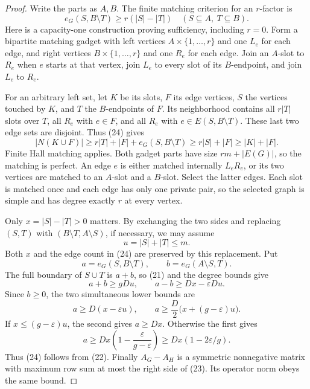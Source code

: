 \begin{proof}
Write the parts as \(A,B\).
The finite matching criterion for an \(r\)-factor is
\[
 e_G(S,B\setminus T)\geq r(|S|-|T|)
 \quad(S\subseteq A,\ T\subseteq B).                         \tag{24}
\]
Here is a capacity-one construction proving sufficiency, including
\(r=0\). Form a bipartite matching gadget with left vertices
\(A\times\{1,\ldots,r\}\) and one \(L_e\) for each edge, and right
vertices \(B\times\{1,\ldots,r\}\) and one \(R_e\) for each edge.
Join an \(A\)-slot to \(R_e\) when \(e\) starts at that vertex,
join \(L_e\) to every slot of its \(B\)-endpoint, and join
\(L_e\) to \(R_e\).

For an arbitrary left set, let \(K\) be its slots, \(F\) its edge
vertices, \(S\) the vertices touched by \(K\), and \(T\) the
\(B\)-endpoints of \(F\). Its neighborhood contains all \(r|T|\)
slots over \(T\), all \(R_e\) with \(e\in F\), and all \(R_e\)
with \(e\in E(S,B\setminus T)\). These last two edge sets are
disjoint. Thus (24) gives
\[
 |N(K\cup F)|\geq r|T|+|F|+e_G(S,B\setminus T)
               \geq r|S|+|F|\geq |K|+|F|.
\]
Finite Hall matching applies. Both gadget parts have size
\(rm+|E(G)|\), so the matching is perfect. An edge \(e\) is
either matched internally \(L_eR_e\), or its two vertices are
matched to an \(A\)-slot and a \(B\)-slot. Select the latter
edges. Each slot is matched once and each edge has only one
private pair, so the selected graph is simple and has degree
exactly \(r\) at every vertex.

Only \(x=|S|-|T|>0\) matters.
By exchanging the two sides and replacing \((S,T)\) with
\((B\setminus T,A\setminus S)\), if necessary, we may assume
\[
 u=|S|+|T|\leq m.
\]
Both \(x\) and the edge count in (24) are preserved by this
replacement. Put
\[
 a=e_G(S,B\setminus T),\qquad b=e_G(A\setminus S,T).
\]
The full boundary of \(S\cup T\) is \(a+b\), so (21) and
the degree bounds give
\[
 a+b\geq gDu,\qquad a-b\geq Dx-\varepsilon Du.
\]
Since \(b\geq0\), the two simultaneous lower bounds are
\[
 a\geq D(x-\varepsilon u),\qquad
 a\geq \frac D2\bigl(x+(g-\varepsilon)u\bigr).                \tag{25}
\]
If \(x\leq(g-\varepsilon)u\), the second gives \(a\geq Dx\).
Otherwise the first gives
\[
 a\geq Dx\left(1-\frac{\varepsilon}{g-\varepsilon}\right)
       \geq Dx(1-2\varepsilon/g).
\]
Thus (24) follows from (22).
Finally \(A_G-A_H\) is a symmetric nonnegative matrix with
maximum row sum at most the right side of (23).
Its operator norm obeys the same bound.
\end{proof}

